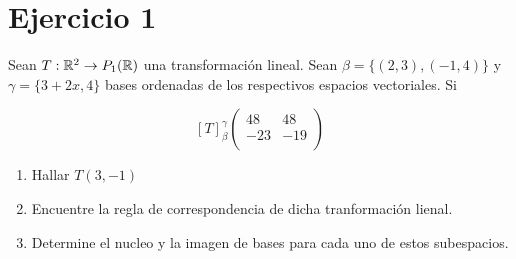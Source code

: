 \section*{Ejercicio 1}

Sean $T : \mathbb{R}^{2} \rightarrow P_{1}(\mathbb{R})$ una transformación lineal. Sean $\beta = \{ (2,3), (-1,4) \}$ y $\gamma = \{ 3 + 2x, 4\}$
bases ordenadas de los respectivos espacios vectoriales. Si

\begin{equation}
    \left[ T \right]_{\beta}^{\gamma}
     \begin{pmatrix}
        48 & 48 \\
       -23 & -19 \\
      \end{pmatrix}  
\end{equation}

\begin{enumerate}
    \item Hallar $T(3,-1)$
    \item Encuentre la regla de correspondencia de dicha tranformación lienal. 
    \item Determine el nucleo y la imagen de bases para cada uno de estos subespacios.
\end{enumerate}
